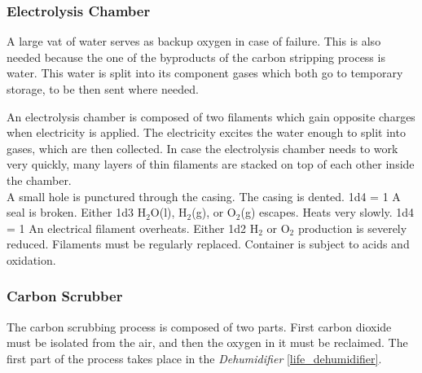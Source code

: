 \documentclass[a4paper]{article}
\begin{document}
\hspace{-18pt} \subsubsection{Electrolysis Chamber} \label{life_electrolysis} \vspace{-0.2cm}
A large vat of water serves as backup oxygen in case of failure. This is also needed because the one of the byproducts of the carbon stripping process is water. This water is split into its component gases which both go to temporary storage, to be then sent where needed.

An electrolysis chamber is composed of two filaments which gain opposite charges when electricity is applied. The electricity excites the water enough to split into gases, which are then collected. In case the electrolysis chamber needs to work very quickly, many layers of thin filaments are stacked on top of each other inside the chamber. 
\\ \pbhw
{A small hole is punctured through the casing. \newline {}}
{The casing is dented. \newline 1d4 = 1 A seal is broken. Either 1d3 H$_2$O(l), H$_2$(g), or O$_2$(g) escapes.}
{Heats very slowly. \newline 1d4 = 1 An electrical filament overheats. Either 1d2 H$_2$ or O$_2$ production is severely reduced.}
{Filaments must be regularly replaced. Container is subject to acids and oxidation.}


\vspace{-0.5cm} \hspace{-18pt} \subsubsection{Carbon Scrubber} \label{life_c_scrubber} \vspace{-0.2cm}
The carbon scrubbing process is composed of two parts. First carbon dioxide must be isolated from the air, and then the oxygen in it must be reclaimed. The first part of the process takes place in the \textit{Dehumidifier} \ref{life_dehumidifier}.
\end{document}
